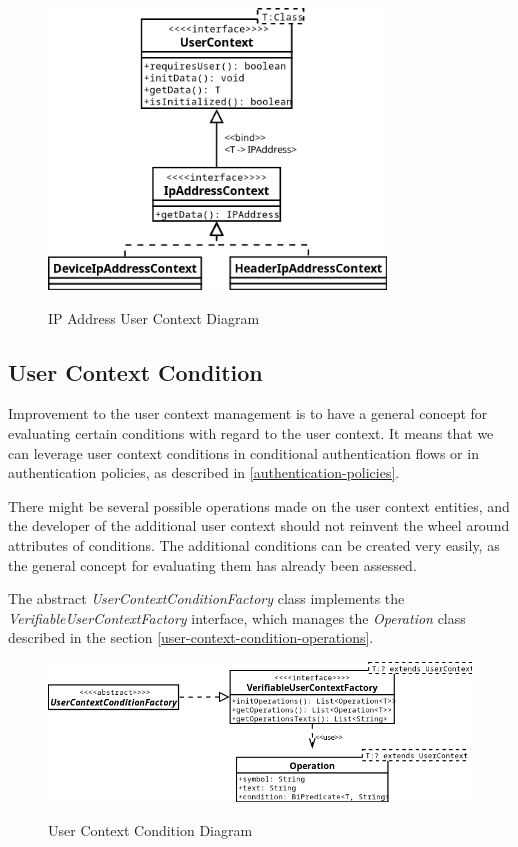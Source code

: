 \begin{figure}[htbp]
  \centering
  \includegraphics[width=0.8\textwidth]{img/sections/5-design/ipAddressContext.png}
  \label{fig:user-context-ip-address-context}
  \caption{IP Address User Context Diagram}
\end{figure}

\newpage

\subsection{User Context Condition}
Improvement to the user context management is to have a general concept for evaluating certain conditions with regard to the user context.
It means that we can leverage user context conditions in conditional authentication flows or in authentication policies, as described in \ref{authentication-policies}.

There might be several possible operations made on the user context entities, and the developer of the additional user context should not reinvent the wheel around attributes of conditions.
The additional conditions can be created very easily, as the general concept for evaluating them has already been assessed.

The abstract \textit{UserContextConditionFactory} class implements the \textit{VerifiableUserContextFactory} interface, which manages the \textit{Operation} class described in the section \ref{user-context-condition-operations}.

\begin{figure}[htbp]
  \centering
  \includegraphics[width=1\textwidth]{img/sections/5-design/UserContextCondition.png}
  \label{fig:user-context-condition}
  \caption{User Context Condition Diagram}
\end{figure}


